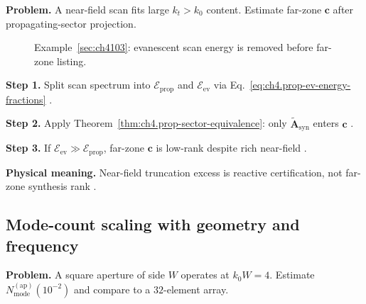 \textbf{Problem.} A near-field scan fits large \(k_{t}>k_{0}\) content. Estimate far-zone \(\mathbf{c}\) after propagating-sector projection.

\begin{figure}[t]
\centering
{}
\caption{Example~\ref{sec:ch4103}: evanescent scan energy is removed before far-zone listing.}
\label{fig:ch4.ex-nf-ff-truncation}
\end{figure}

\textbf{Step 1.} Split scan spectrum into \(\mathcal{E}_{\mathrm{prop}}\) and \(\mathcal{E}_{\mathrm{ev}}\) via
Eq.~\eqref{eq:ch4.prop-ev-energy-fractions} \cite{stratton1941,jackson1999}.

\textbf{Step 2.} Apply Theorem~\ref{thm:ch4.prop-sector-equivalence}: only \(\widetilde{\mathbf{A}}_{\mathrm{syn}}\) enters \(\mathbf{c}\)
\cite{harrington2001,devaney2004}.

\textbf{Step 3.} If \(\mathcal{E}_{\mathrm{ev}}\gg\mathcal{E}_{\mathrm{prop}}\), far-zone \(\mathbf{c}\) is low-rank despite rich near-field
\cite{stratton1941,hansen1988}.

\textbf{Physical meaning.} Near-field truncation excess is reactive certification, not far-zone synthesis rank \cite{harrington2001}.


\subsection{Mode-count scaling with geometry and frequency}
\label{sec:ch4104}

\textbf{Problem.} A square aperture of side \(W\) operates at \(k_{0}W=4\). Estimate \(N_{\mathrm{mode}}^{\mathrm{(ap)}}(10^{-2})\) and compare
to a \(32\)-element array.

